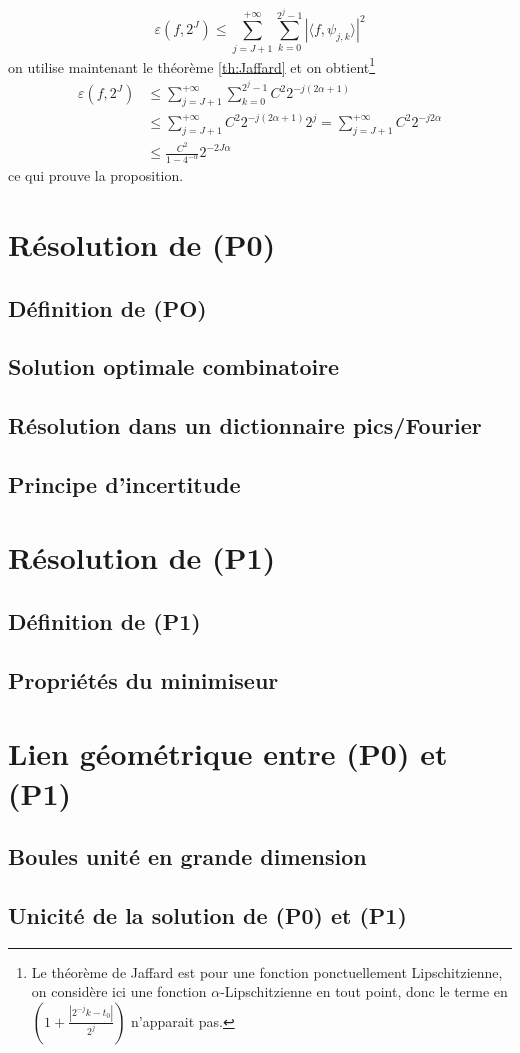\begin{preuve}
	\begin{equation*}
		\varepsilon(f, 2^J) \leq \sum_{j=J+1}^{+\infty} \sum_{k=0}^{2^j -1} |\langle f, \psi_{j,k} \rangle|^2
	\end{equation*}
	on utilise maintenant le théorème \ref{th:Jaffard} et on obtient\footnote{Le théorème de Jaffard est pour une fonction ponctuellement Lipschitzienne, on considère ici une fonction $\alpha$-Lipschitzienne en tout point, donc le terme en $(1 + \frac{|2^{-j}k -t_0|}{2^j})$ n'apparait pas.}
	\begin{align*}
		\varepsilon(f, 2^J) &\leq \sum_{j=J+1}^{+\infty} \sum_{k=0}^{2^j -1} C^2 2^{-j(2\alpha + 1)} \\
		&\leq \sum_{j=J+1}^{+\infty} C^2 2^{-j(2\alpha + 1)} 2^{j} = \sum_{j=J+1}^{+\infty} C^2 2^{-j2\alpha} \\
		&\leq \frac{C^2}{1 - 4^{-\alpha}} 2^{-2J\alpha}	
	\end{align*}
	ce qui prouve la proposition.\qedhere
\end{preuve}
\section{Résolution de (P0)}
\subsection{Définition de (PO)}
\subsection{Solution optimale combinatoire}
\subsection{Résolution dans un dictionnaire pics/Fourier}
\subsection{Principe d'incertitude}

\section{Résolution de (P1)}
\subsection{Définition de (P1)}
\subsection{Propriétés du minimiseur}

\section{Lien géométrique entre (P0) et (P1)}
\subsection{Boules unité en grande dimension}
\subsection{Unicité de la solution de (P0) et (P1)}



